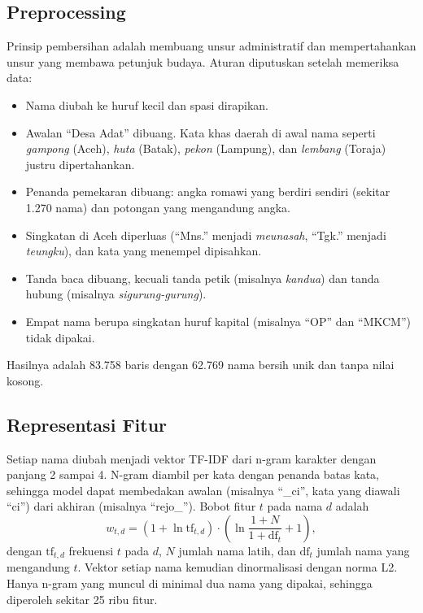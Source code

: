 \documentclass[conference]{IEEEtran}
\begin{document}
\subsection{Preprocessing}

Prinsip pembersihan adalah membuang unsur administratif dan mempertahankan unsur yang membawa petunjuk budaya. Aturan diputuskan setelah memeriksa data:
\begin{itemize}
\item Nama diubah ke huruf kecil dan spasi dirapikan.
\item Awalan ``Desa Adat'' dibuang. Kata khas daerah di awal nama seperti \textit{gampong} (Aceh), \textit{huta} (Batak), \textit{pekon} (Lampung), dan \textit{lembang} (Toraja) justru dipertahankan.
\item Penanda pemekaran dibuang: angka romawi yang berdiri sendiri (sekitar 1.270 nama) dan potongan yang mengandung angka.
\item Singkatan di Aceh diperluas (``Mns.'' menjadi \textit{meunasah}, ``Tgk.'' menjadi \textit{teungku}), dan kata yang menempel dipisahkan.
\item Tanda baca dibuang, kecuali tanda petik (misalnya \textit{kandua\textquotesingle}) dan tanda hubung (misalnya \textit{sigurung-gurung}).
\item Empat nama berupa singkatan huruf kapital (misalnya ``OP'' dan ``MKCM'') tidak dipakai.
\end{itemize}
Hasilnya adalah 83.758 baris dengan 62.769 nama bersih unik dan tanpa nilai kosong.

\subsection{Representasi Fitur}

Setiap nama diubah menjadi vektor TF-IDF \cite{salton1988} dari n-gram karakter dengan panjang 2 sampai 4. N-gram diambil per kata dengan penanda batas kata, sehingga model dapat membedakan awalan (misalnya ``\_ci'', kata yang diawali ``ci'') dari akhiran (misalnya ``rejo\_''). Bobot fitur $t$ pada nama $d$ adalah
\begin{equation}
w_{t,d} = \left(1 + \ln \mathrm{tf}_{t,d}\right) \cdot \left(\ln \frac{1 + N}{1 + \mathrm{df}_t} + 1\right),
\end{equation}
dengan $\mathrm{tf}_{t,d}$ frekuensi $t$ pada $d$, $N$ jumlah nama latih, dan $\mathrm{df}_t$ jumlah nama yang mengandung $t$. Vektor setiap nama kemudian dinormalisasi dengan norma L2. Hanya n-gram yang muncul di minimal dua nama yang dipakai, sehingga diperoleh sekitar 25 ribu fitur.
\end{document}
